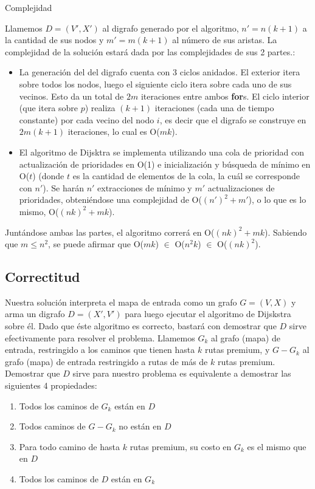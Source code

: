 \begin{subsection}{Complejidad}

Llamemos $D=(V',X')$ al digrafo generado por el algoritmo, $n'=n(k+1)$ a la cantidad de sus nodos y $m'=m(k+1)$ al número de sus aristas. La complejidad de la solución estará dada por las complejidades de sus 2 partes.:
\begin{itemize}

\item La generación del del digrafo cuenta con 3 ciclos anidados. El exterior itera sobre todos los nodos, luego el siguiente ciclo itera sobre cada uno de sus vecinos. Esto da un total de $2m$ iteraciones entre ambos \textbf{for}s. El ciclo interior (que itera sobre $p$) realiza $(k+1)$ iteraciones (cada una de tiempo constante) por cada vecino del nodo $i$, es decir que el digrafo se construye en $2m(k+1)$ iteraciones, lo cual es O($mk$).
\item El algoritmo de Dijsktra se implementa utilizando una cola de prioridad con actualización de prioridades en O(1) e inicialización y búsqueda de mínimo en O($t$) (donde $t$ es la cantidad de elementos de la cola, la cuál se corresponde con $n'$). Se harán $n'$ extracciones de mínimo y $m'$ actualizaciones de prioridades, obteniéndose una complejidad de O($(n')^2 + m'$), o lo que es lo mismo, O($(nk)^2 + mk$). 
\end{itemize}

Juntándose ambas las partes, el algoritmo correrá en O($(nk)^2 + mk$). Sabiendo que $m \leq n^2$, se puede afirmar que O($mk$) $\in$ O($n^2k$) $\in$ O($(nk)^2$).

\subsection{Correctitud}

Nuestra solución interpreta el mapa de entrada como un grafo $G=(V,X)$ y arma un digrafo $D=(X',V')$ para luego ejecutar el algoritmo de Dijskstra sobre él. Dado que éste algoritmo es correcto, bastará con demostrar que $D$ sirve efectivamente para resolver el problema. Llamemos $G_k$ al grafo (mapa) de entrada, restringido a los caminos que tienen hasta $k$ rutas premium, y $G - G_k$ al grafo (mapa) de entrada restringido a rutas de más de $k$ rutas premium. Demostrar que $D$ sirve para nuestro problema es equivalente a demostrar las siguientes 4 propiedades:


\begin{enumerate}
\item Todos los caminos de $G_k$ están en $D$
\item Todos caminos de $G - G_k$ no están en $D$
\item Para todo camino de hasta $k$ rutas premium, su costo en $G_k$ es el mismo que en $D$
\item Todos los caminos de $D$ están en $G_k$
\end{enumerate}


\end{subsection}
